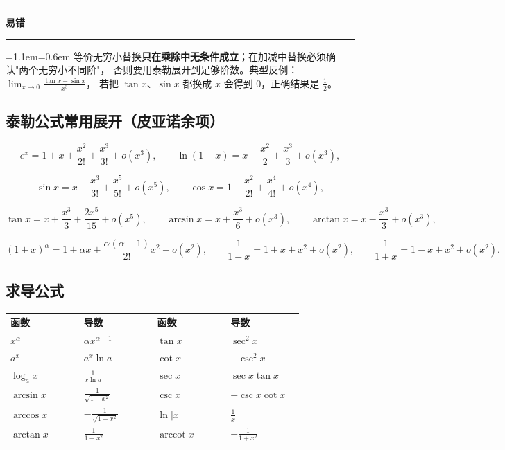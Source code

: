 \documentclass[11pt,openany,UTF8]{ctexbook}
\newcommand{\callouthead}[2]{%
  \par\addvspace{7pt}\noindent
  {\color{#1}\rule[-0.15em]{3pt}{1.05em}}\hspace{0.5em}%
  {\bfseries\color{#1}#2}\par\nobreak\vspace{-0.35em}%
  {\color{rulesep}\hrule height 0.4pt}\nobreak\vspace{0.45em}%
  \begingroup\small\setlength{\parindent}{0pt}%
  \leftskip=1.1em\rightskip=0.6em\noindent\ignorespaces}
\newcommand{\calloutend}{\par\endgroup\addvspace{7pt}}
\newenvironment{callwarn}[1]{\callouthead{warnbar}{#1}}{\calloutend}
\begin{document}
\begin{callwarn}{易错}
等价无穷小替换\textbf{只在乘除中无条件成立}；在加减中替换必须确认"两个无穷小不同阶"， 否则要用泰勒展开到足够阶数。典型反例：$\lim_{x\to0}\frac{\tan x-\sin x}{x^3}$， 若把 $\tan x$、$\sin x$ 都换成 $x$ 会得到 0，正确结果是 $\frac12$。

\end{callwarn}

\subsection{泰勒公式常用展开（皮亚诺余项）}

\[e^x=1+x+\frac{x^2}{2!}+\frac{x^3}{3!}+o(x^3),\qquad
\ln(1+x)=x-\frac{x^2}{2}+\frac{x^3}{3}+o(x^3),\]

\[\sin x=x-\frac{x^3}{3!}+\frac{x^5}{5!}+o(x^5),\qquad
\cos x=1-\frac{x^2}{2!}+\frac{x^4}{4!}+o(x^4),\]

\[\tan x=x+\frac{x^3}{3}+\frac{2x^5}{15}+o(x^5),\qquad
\arcsin x=x+\frac{x^3}{6}+o(x^3),\qquad \arctan x=x-\frac{x^3}{3}+o(x^3),\]

\[(1+x)^{\alpha}=1+\alpha x+\frac{\alpha(\alpha-1)}{2!}x^2+o(x^2),\qquad
\frac{1}{1-x}=1+x+x^2+o(x^2),\qquad \frac{1}{1+x}=1-x+x^2+o(x^2).\]

\subsection{求导公式}

\begingroup\small\setlength{\tabcolsep}{4.0pt}
\begin{longtable}{@{}L{0.2278\linewidth}L{0.2278\linewidth}L{0.2278\linewidth}L{0.2278\linewidth}@{}}
\toprule
\textbf{函数} & \textbf{导数} & \textbf{函数} & \textbf{导数} \\
\midrule
\endhead
$x^{\alpha}$ & $\alpha x^{\alpha-1}$ & $\tan x$ & $\sec^2 x$ \\
$a^x$ & $a^x\ln a$ & $\cot x$ & $-\csc^2 x$ \\
$\log_a x$ & $\frac{1}{x\ln a}$ & $\sec x$ & $\sec x\tan x$ \\
$\arcsin x$ & $\frac{1}{\sqrt{1-x^2}}$ & $\csc x$ & $-\csc x\cot x$ \\
$\arccos x$ & $-\frac{1}{\sqrt{1-x^2}}$ & $\ln\vert x\vert$ & $\frac1x$ \\
$\arctan x$ & $\frac{1}{1+x^2}$ & $\operatorname{arccot} x$ & $-\frac{1}{1+x^2}$ \\
\bottomrule
\end{longtable}
\endgroup
\end{document}
